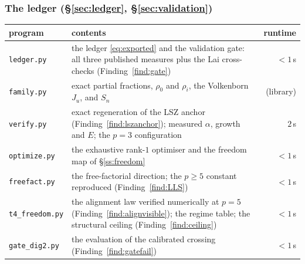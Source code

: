 \subsubsection*{The ledger (\S\ref{sec:ledger}, \S\ref{sec:validation})}
\begin{center}
\scriptsize\setlength{\tabcolsep}{4pt}
\begin{tabular}{lp{}r}
\toprule
program & contents & runtime\\
\midrule
\texttt{ledger.py} & the ledger \eqref{eq:exported} and the validation gate: all three
  published measures plus the Lai cross-checks (Finding~\ref{find:gate}) & $<1$\,s\\
\texttt{family.py} & exact partial fractions, $\rho_0$ and $\rho_i$, the Volkenborn $J_u$,
  and $S_n$ & (library)\\
\texttt{verify.py} & exact regeneration of the LSZ anchor (Finding~\ref{find:lszanchor});
  measured $\alpha$, growth and $E$; the $p=3$ configuration & $2$\,s\\
\texttt{optimize.py} & the exhaustive rank-$1$ optimiser and the freedom map of
  \S\ref{ss:freedom} & $<1$\,s\\
\texttt{freefact.py} & the free-factorial direction; the $p\ge5$ constant reproduced
  (Finding~\ref{find:LLS}) & $<1$\,s\\
\texttt{t4\_freedom.py} & the alignment law verified numerically at $p=5$
  (Finding~\ref{find:alignvisible}); the regime table; the structural ceiling
  (Finding~\ref{find:ceiling}) & $<1$\,s\\
\texttt{gate\_dig2.py} & the evaluation of the calibrated crossing
  (Finding~\ref{find:gatefail}) & $<1$\,s\\
\bottomrule
\end{tabular}
\end{center}

